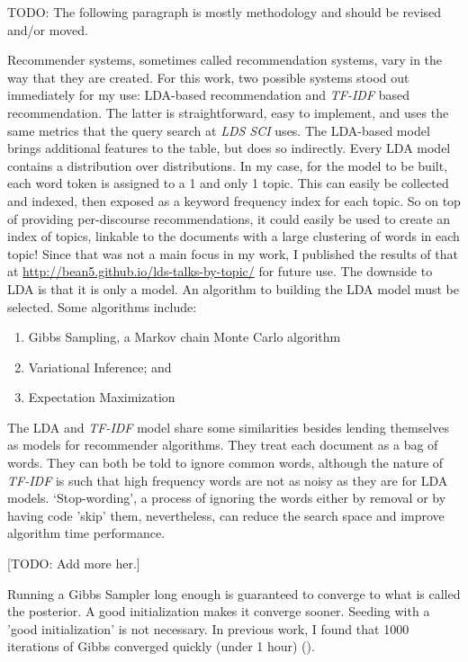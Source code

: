 TODO: The following paragraph is mostly methodology and should be revised and/or moved.

Recommender systems, sometimes called recommendation systems, vary in the way that they are created. For this work, two possible systems stood out immediately for my use: LDA-based recommendation and \emph{TF-IDF} based recommendation. The latter is straightforward, easy to implement, and uses the same metrics that the query search at \emph{LDS SCI} uses. The LDA-based model brings additional features to the table, but does so indirectly. Every LDA model contains a distribution over distributions. In my case, for the model to be built, each word token is assigned to a 1 and only 1 topic. This can easily be collected and indexed, then exposed as a keyword frequency index for each topic. So on top of providing per-discourse recommendations, it could easily be used to create an index of topics, linkable to the documents with a large clustering of words in each topic! Since that was not a main focus in my work, I published the results of that at \url{http://bean5.github.io/lds-talks-by-topic/} for future use. The downside to LDA is that it is only a model. An algorithm to building the LDA model must be selected. Some algorithms include:

\begin{enumerate}
  \item Gibbs Sampling, a Markov chain Monte Carlo algorithm
  \item Variational Inference; and
  \item Expectation Maximization
\end{enumerate}

The LDA and \emph{TF-IDF} model share some similarities besides lending themselves as models for recommender algorithms. They treat each document as a bag of words. They can both be told to ignore common words, although the nature of \emph{TF-IDF} is such that high frequency words are not as noisy as they are for LDA models. `Stop-wording', a process of ignoring the words either by removal or by having code 'skip' them, nevertheless, can reduce the search space and improve algorithm time performance.

[TODO: Add more her.]

Running a Gibbs Sampler long enough is guaranteed to converge to what is called the posterior. A good initialization makes it converge sooner. Seeding with a 'good initialization' is not necessary. In previous work, I found that 1000 iterations of Gibbs converged quickly (under 1 hour) (\citealp{bean5-LDA-ToT}).

